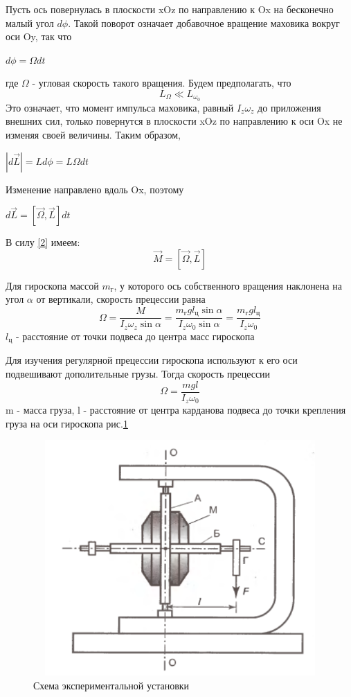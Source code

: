 \documentclass[12pt,a4paper]{article}
\begin{document}
Пусть ось повернулась в плоскости xOz по направлению к Ox на бесконечно малый угол $d\phi$. Такой поворот означает добавочное вращение маховика вокруг оси Oy, так что 
\begin{center}
$d\phi=\Omega{dt}$
\end{center}
где $\Omega$ - угловая скорость такого вращения. Будем предполагать, что 
\begin{equation}
L_{\Omega} \ll L_{\omega_{0}} \label{5}
\end{equation}
Это означает, что момент импульса маховика, равный $I_{z}\omega_{z}$ до приложения внешних сил, только повернутся в плоскости xOz по направлению к оси Ox не изменяя своей величины. Таким образом,
\begin{center}
$|d\vec{L}|=Ld\phi=L\Omega{dt}$
\end{center}
Изменение направлено вдоль Ox, поэтому 
\begin{center}
$d\vec{L}=[\vec{\Omega},\vec{L}]dt$
\end{center}
В силу \ref{2} имеем:
\begin{equation}
\vec{M}=[\vec{\Omega}, \vec{L}] \label{6}
\end{equation}
\par Для гироскопа массой $m_{г}$, у которого ось собственного вращения наклонена на угол $\alpha$ от вертикали, скорость прецессии равна
\begin{equation}
\Omega=\frac{M}{I_{z}\omega_{z}\sin{\alpha}}=\frac{m_{г}gl_{ц}\sin{\alpha}}{I_{z}\omega_{0}\sin{\alpha}}=\frac{m_{г}gl_{ц}}{I_{z}\omega_{0}} \label{7}
\end{equation}
$l_{ц}$ - расстояние от точки подвеса до центра масс гироскопа
\par Для изучения регулярной прецессии гироскопа используют к его оси подвешивают дополительные грузы. Тогда скорость прецессии
\begin{equation}
\Omega=\frac{mgl}{I_{z}\omega_{0}} \label{8}
\end{equation}
m - масса груза, l - расстояние от центра карданова подвеса до точки крепления груза на оси гироскопа рис.\ref{рис.2}
\begin{figure}[H]
\centering
\includegraphics[width=12cm, height=9cm]{1.2.5_2}
\caption{Схема экспериментальной установки}
\label{рис.2}
\end{figure}
\end{document}

